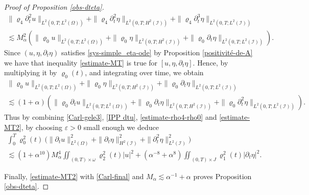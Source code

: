 \documentclass[a4paper, 12pt]{article}
\theoremstyle{plain}
\theoremstyle{definition}
\numberwithin{theorem}{section}
\numberwithin{equation}{section}
\begin{document}
{\begin{proof}[Proof of Proposition \ref{obs-dteta}]
\begin{multline}\label{estimate-rho4-rho0}
\|\varrho_4\partial^2_tu\|_{L^2(0,T; L^2(\Omega))}+\|\varrho_4\partial^2_t\eta\|_{L^2(0,T; H^2(\mathcal{I}))}+\|\varrho_4\partial^3_t\eta\|_{L^2(0,T; L^2(\mathcal{I}))}\\ \lesssim M_\alpha^2\left(\|\varrho_0u\|_{L^2(0,T; L^2(\Omega))}+\|\varrho_0\eta\|_{L^2(0,T; H^2(\mathcal{I}))}+\|\varrho_0\partial_t\eta\|_{L^2(0,T; L^2(\mathcal{I}))}\right).
\end{multline}
Since $(u,\eta,\partial_t \eta)$ satisfies \eqref{sys-simple_eta-ode} by Proposition \ref{positivité-de-A} we have that inequality \eqref{estimate-MT} is true for $[u,\eta,\partial_t \eta]$. Hence, by multiplying it by $\varrho_0(t)$, and integrating over time, we obtain
\begin{multline}
    \label{estimate-MT2}
\|\varrho_0u\|_{L^2(0,T; L^2(\Omega))}+\|\varrho_0\eta\|_{L^2(0,T; H^2(\mathcal{I}))}+\|\varrho_0\partial_t\eta\|_{L^2(0,T; L^2(\mathcal{I}))}\\
\lesssim (1+\alpha)(\|\varrho_0 \partial_t u\|_{L^2(0,T; L^2(\Omega))}+\|\varrho_0\partial_t \eta\|_{L^2(0,T; H^2(\mathcal{I}))}+\|\varrho_0\partial_t^2\eta\|_{L^2(0,T; L^2(\mathcal{I}))}).
\end{multline}
Thus by combining \eqref{Carl-gele3}, \eqref{IPP dtu}, \eqref{estimate-rho4-rho0} and \eqref{estimate-MT2}, by choosing $\varepsilon>0$ small enough we deduce
\begin{multline}\label{Carl-final}
\int_{0}^T\varrho^2_0(t)~\big(\|\partial_tu\|_{L^2(\Omega)}^2+\|\partial_t\eta\|^2_{H^2(\mathcal{I})}+\|\partial^2_t\eta\|^2_{L^2(\mathcal{I})}\big)\\
\lesssim (1+\alpha^{10})M_\alpha^4\iint_{(0,T)\times\omega}\varrho^2_2(t)|u|^2+ \left(\alpha^{-8}+\alpha^8\right)\iint_{(0,T)\times J}\varrho^2_1(t)|\partial_t\eta|^2.
\end{multline}

Finally, \eqref{estimate-MT2} with \eqref{Carl-final} and $M_\alpha\lesssim \alpha^{-1}+\alpha$ proves Proposition \ref{obs-dteta}.
\end{proof}


}
\end{document}
